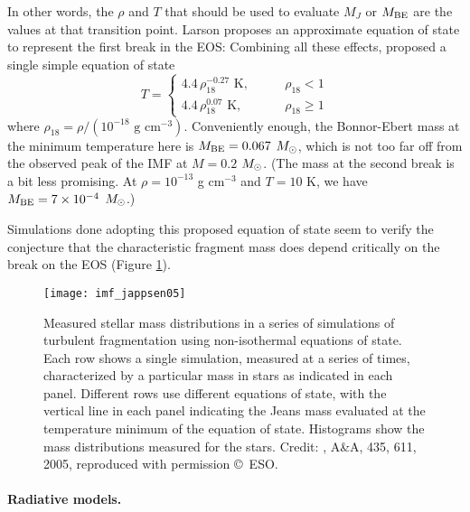 In other words, the $\rho$ and $T$ that should be used to evaluate $M_J$ or $M_{\rm BE}$ are the values at that transition point. Larson proposes an approximate equation of state to represent the first break in the EOS:
Combining all these effects, \citet{larson05a} proposed a single simple equation of state
\begin{equation}
T = \left\{
\begin{array}{ll}
4.4 \,\rho_{18}^{-0.27}\mbox{ K}, \qquad & \rho_{18} < 1 \\
4.4 \,\rho_{18}^{0.07}\mbox{ K}, & \rho_{18} \ge 1
\end{array}
\right.
\end{equation}
where $\rho_{18}=\rho/(10^{-18}\mbox{ g cm}^{-3})$. Conveniently enough, the Bonnor-Ebert mass at the minimum temperature here is $M_{\rm BE} = 0.067$ $M_{\odot}$, which is not too far off from the observed peak of the IMF at $M=0.2$ $M_{\odot}$. (The mass at the second break is a bit less promising. At $\rho = 10^{-13}$ g cm$^{-3}$ and $T=10$ K, we have $M_{\rm BE} = 7\times 10^{-4}$ $M_{\odot}$.)

Simulations done adopting this proposed equation of state seem to verify the conjecture that the characteristic fragment mass does depend critically on the break on the EOS (Figure \ref{fig:imf_jappsen05}).

\begin{figure}
\texttt{[image: imf\_jappsen05]}
\caption[IMF from simulations of non-isothermal fragmentation]{
\label{fig:imf_jappsen05}
Measured stellar mass distributions in a series of simulations of turbulent fragmentation using non-isothermal equations of state. Each row shows a single simulation, measured at a series of times, characterized by a particular mass in stars as indicated in each panel. Different rows use different equations of state, with the vertical line in each panel indicating the Jeans mass evaluated at the temperature minimum of the equation of state. Histograms show the mass distributions measured for the stars. Credit: \citeauthor{jappsen05a}, A\&A, 435, 611, 2005, reproduced with permission \copyright\, ESO.
}
\end{figure}

\paragraph{Radiative models.}

